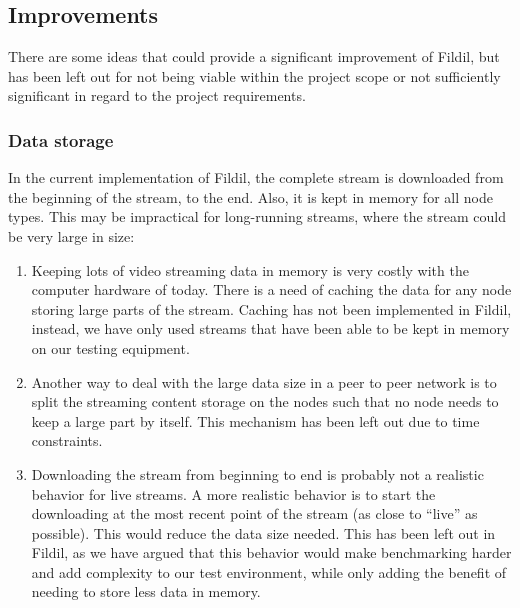\documentclass[10pt, a4paper]{article}
\begin{document}



\subsection{Improvements}

There are some ideas that could provide a significant improvement of Fildil, but
has been left out for not being viable within the project scope or not
sufficiently significant in regard to the project requirements.

\subsubsection{Data storage}
\label{sec:storage-improvements}

In the current implementation of Fildil, the complete stream is downloaded from
the beginning of the stream, to the end. Also, it is kept in memory for all node
types. This may be impractical for long-running streams, where the stream could
be very large in size:

\begin{enumerate}
\item Keeping lots of video streaming data in memory is very costly with the
  computer hardware of today. There is a need of caching the data for any node
  storing large parts of the stream. Caching has not been implemented in Fildil,
  instead, we have only used streams that have been able to be kept in memory on
  our testing equipment.
\item Another way to deal with the large data size in a peer to peer network is
  to split the streaming content storage on the nodes such that no node needs to
  keep a large part by itself. This mechanism has been left out due to time
  constraints. %
\item Downloading the stream from beginning to end is probably not a realistic
  behavior for live streams. A more realistic behavior is to start the
  downloading at the most recent point of the stream (as close to ``live'' as
  possible). This would reduce the data size needed. This has been left out in
  Fildil, as we have argued that this behavior would make benchmarking harder
  and add complexity to our test environment, while only adding the benefit of
  needing to store less data in memory.
\end{enumerate}
\end{document}
